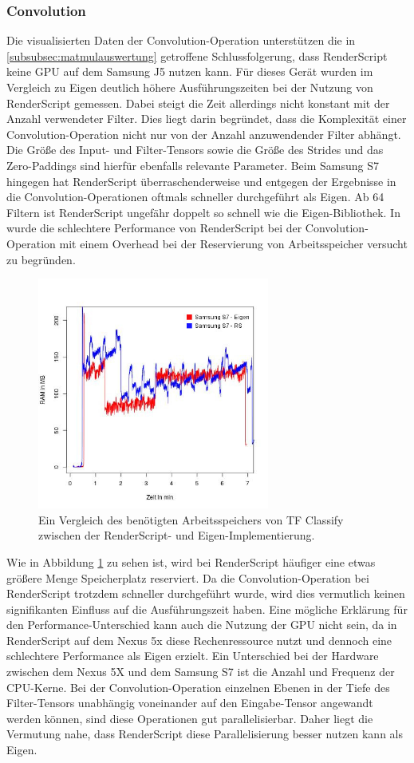\subsubsection{Convolution}
\label{subsubsec:convauswertung}
Die visualisierten Daten der Convolution-Operation unterstützen die in \ref{subsubsec:matmulauswertung} getroffene Schlussfolgerung, dass RenderScript keine GPU auf dem Samsung J5 nutzen kann. Für dieses Gerät wurden im Vergleich zu Eigen deutlich höhere Ausführungszeiten bei der Nutzung von RenderScript gemessen.  Dabei steigt die Zeit allerdings nicht konstant mit der Anzahl verwendeter Filter. Dies liegt darin begründet, dass die Komplexität einer Convolution-Operation nicht nur von der Anzahl anzuwendender Filter abhängt. Die Größe des Input- und Filter-Tensors sowie die Größe des Strides und das Zero-Paddings sind hierfür ebenfalls relevante Parameter. Beim Samsung S7 hingegen hat RenderScript überraschenderweise und entgegen der Ergebnisse in \cite{rstensorflow2017} die Convolution-Operationen oftmals schneller durchgeführt als Eigen. Ab 64 Filtern ist RenderScript ungefähr doppelt so schnell wie die Eigen-Bibliothek. In \cite{rstensorflow2017} wurde die schlechtere Performance von RenderScript bei der Convolution-Operation mit einem Overhead bei der Reservierung von Arbeitsspeicher versucht zu begründen. 
\begin{figure}[!t]
	\centering
	\includegraphics[width=3.0in]{images/s7Trepn-eigen-rs-memory-app-legende.jpg}
	\caption{Ein Vergleich des benötigten Arbeitsspeichers von TF Classify zwischen der RenderScript- und Eigen-Implementierung.}
	\label{fig:s7ram}
\end{figure}
Wie in Abbildung \ref{fig:s7ram} zu sehen ist, wird bei RenderScript häufiger eine etwas größere Menge Speicherplatz reserviert. Da die Convolution-Operation bei RenderScript trotzdem schneller durchgeführt wurde, wird dies vermutlich keinen signifikanten Einfluss auf die Ausführungszeit haben. Eine mögliche Erklärung für den Performance-Unterschied kann auch die Nutzung der GPU nicht sein, da in \cite{rstensorflow2017} RenderScript auf dem Nexus 5x diese Rechenressource nutzt und dennoch eine schlechtere Performance als Eigen erzielt. Ein Unterschied bei der Hardware zwischen dem Nexus 5X und dem Samsung S7 ist die Anzahl und Frequenz der CPU-Kerne. Bei der Convolution-Operation einzelnen Ebenen in der Tiefe des Filter-Tensors unabhängig voneinander auf den Eingabe-Tensor angewandt werden können, sind diese Operationen gut parallelisierbar. Daher liegt die Vermutung nahe, dass RenderScript diese Parallelisierung besser nutzen kann als Eigen. 

